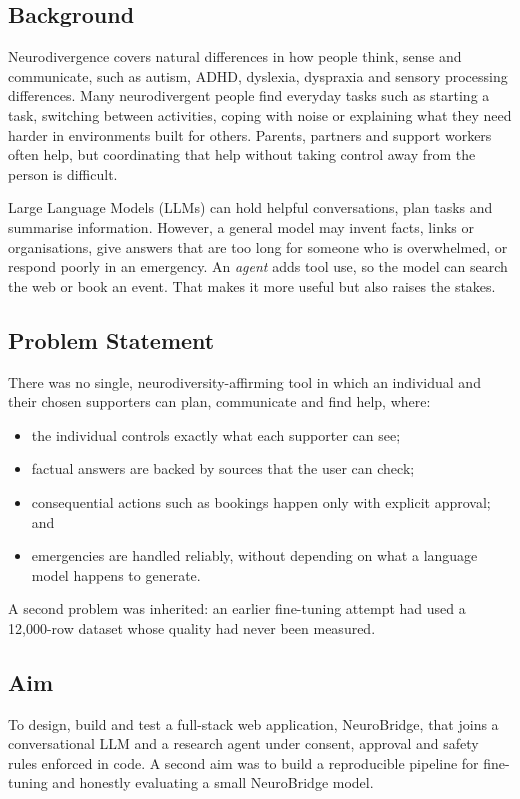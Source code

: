 \documentclass[11pt,a4paper]{article}
\begin{document}
\subsection{Background}
Neurodivergence covers natural differences in how people think, sense and communicate, such as
autism, ADHD, dyslexia, dyspraxia and sensory processing differences. Many neurodivergent people
find everyday tasks such as starting a task, switching between activities, coping with noise or explaining what they
need harder in environments built for others. Parents, partners and support workers often help,
but coordinating that help without taking control away from the person is difficult.

Large Language Models (LLMs) can hold helpful conversations, plan tasks and summarise information.
However, a general model may invent facts, links or organisations, give answers that are too long
for someone who is overwhelmed, or respond poorly in an emergency. An \emph{agent} adds tool use, so
the model can search the web or book an event. That makes it more useful but also raises the stakes.

\subsection{Problem Statement}
There was no single, neurodiversity-affirming tool in which an individual and their chosen
supporters can plan, communicate and find help, where:
\begin{itemize}
  \item the individual controls exactly what each supporter can see;
  \item factual answers are backed by sources that the user can check;
  \item consequential actions such as bookings happen only with explicit approval; and
  \item emergencies are handled reliably, without depending on what a language model happens to generate.
\end{itemize}
A second problem was inherited: an earlier fine-tuning attempt had used a 12,000-row dataset
whose quality had never been measured.

\subsection{Aim}
To design, build and test a full-stack web application, NeuroBridge, that joins a conversational LLM
and a research agent under consent, approval and safety rules enforced in code. A second aim was to build a
reproducible pipeline for fine-tuning and honestly evaluating a small NeuroBridge model.
\end{document}
